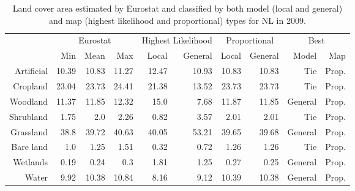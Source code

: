     \begin{table}[H]
    \centering
    \caption{Land cover area estimated by Eurostat and classified by both model (local and general) and map (highest likelihood and proportional) types for NL in 2009.}
    
    \begin{tabular}{r|rrr|rr|rr|rr}
    \toprule
    {} & \multicolumn{3}{|c}{Eurostat} & \multicolumn{2}{|c}{Highest Likelihood} & \multicolumn{2}{|c}{Proportional} & \multicolumn{2}{|c}{Best} \\
    {} &      Min &   Mean &    Max &              Local & General &        Local & General &    Model &    Map \\
    \midrule
    Artificial &    10.39 &  10.83 &  11.27 &              12.47 &   10.93 &        10.83 &   10.83 &      Tie &  Prop. \\
    Cropland   &    23.04 &  23.73 &  24.41 &              21.38 &   13.52 &        23.73 &   23.73 &      Tie &  Prop. \\
    Woodland   &    11.37 &  11.85 &  12.32 &               15.0 &    7.68 &        11.87 &   11.85 &  General &  Prop. \\
    Shrubland  &     1.75 &    2.0 &   2.26 &               0.82 &    3.57 &         2.01 &    2.01 &      Tie &  Prop. \\
    Grassland  &     38.8 &  39.72 &  40.63 &              40.05 &   53.21 &        39.65 &   39.68 &  General &  Prop. \\
    Bare land  &      1.0 &   1.25 &   1.51 &               0.32 &    0.72 &         1.26 &    1.26 &      Tie &  Prop. \\
    Wetlands   &     0.19 &   0.24 &    0.3 &               1.81 &    1.25 &         0.27 &    0.25 &  General &  Prop. \\
    Water      &     9.92 &  10.38 &  10.84 &               8.16 &    9.12 &        10.39 &   10.38 &  General &  Prop. \\
    \bottomrule
    \end{tabular}
    \end{table}
    
